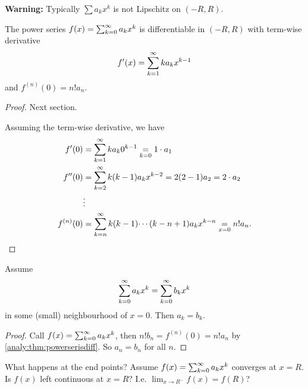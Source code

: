\documentclass[10pt, a4paper]{article}
\begin{document}
\textbf{Warning:}
Typically $\sum a_kx ^ k$ is not Lipschitz on $(-R, R)$.

\begin{theorem}\label{analy:thm:powerserisdiff}
    The power series $f(x) = \infsumo a_kx ^ k$ is differentiable in $(-R, R)$ with term-wise derivative
    \[
    f'(x) = \infsum ka_kx ^ {k - 1}
    \]
    and $f ^ {(n)}(0) = n!a_n$.

    \begin{proof}
        Next section.
        
        Assuming the term-wise derivative,
        we have
        \begin{align*}
            f'(0) &= \infsum ka_k0 ^ {k - 1} \underset{k = 0}{=} 1 \cdot a_1 \\
            f''(0) &= \infsum[k = 2]k(k - 1)a_kx ^ {k - 2} = 2(2 - 1)a_2 = 2 \cdot a_2 \\
            &\vdots \\
            f ^ {(n)}(0) &= \infsum[k = n]k(k - 1) \dotsi (k - n + 1)a_kx ^ {k - n} \underset{x = 0}{=} n!a_n.
        \end{align*}
    \end{proof}
\end{theorem}

\begin{theorem}
    Assume
    \[
    \infsumo a_kx ^ k = \infsumo b_kx ^ k
    \]
    in some
    (small)
    neighbourhood of $x = 0$.
    Then $a_k = b_k$.

    \begin{proof}
        Call $f(x) = \infsumo a_kx ^ k$,
        then $n!b_n = f ^ {(n)}(0) = n!a_n$ by \autoref{analy:thm:powerserisdiff}.
        So $a_n = b_n$ for all $n$.
    \end{proof}
\end{theorem}

What happens at the end points?
Assume $f(x) = \infsumo a_kx ^ k$ converges at $x = R$.
Is $f(x)$ left continuous at $x = R$?
I.e. $\lim_{x \rightarrow R ^ {-}}f(x) = f(R)$?

\begin{theorem}
    
\end{theorem}
\end{document}
